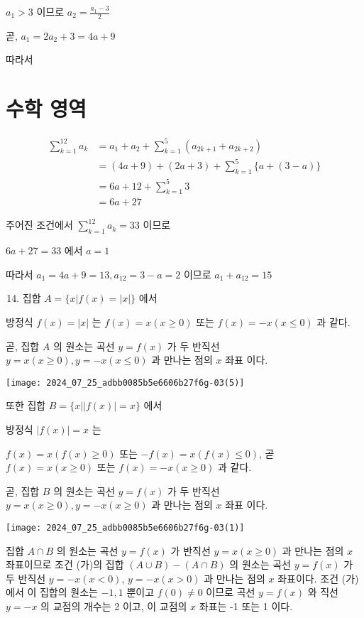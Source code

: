 \documentclass[10pt]{article}
\begin{document}
$a_{1}>3$ 이므로 $a_{2}=\frac{a_{1}-3}{2}$

곧, $a_{1}=2 a_{2}+3=4 a+9$

따라서

\section*{수학 영역}
\[
\begin{aligned}
\sum_{k=1}^{12} a_{k} & =a_{1}+a_{2}+\sum_{k=1}^{5}\left(a_{2 k+1}+a_{2 k+2}\right) \\
& =(4 a+9)+(2 a+3)+\sum_{k=1}^{5}\{a+(3-a)\} \\
& =6 a+12+\sum_{k=1}^{5} 3 \\
& =6 a+27
\end{aligned}
\]

주어진 조건에서 $\sum_{k=1}^{12} a_{k}=33$ 이므로

$6 a+27=33$ 에서 $a=1$

따라서 $a_{1}=4 a+9=13, a_{12}=3-a=2$ 이므로 $a_{1}+a_{12}=15$

\begin{enumerate}
  \setcounter{enumi}{13}
  \item 집합 $A=\{x|f(x)=| x \mid\}$ 에서
\end{enumerate}

방정식 $f(x)=|x|$ 는 $f(x)=x(x \geq 0)$ 또는 $f(x)=-x(x \leq 0)$ 과 같다.

곧, 집합 $A$ 의 원소는 곡선 $y=f(x)$ 가 두 반직선 $y=x(x \geq 0), y=-x(x \leq 0)$ 과 만나는 점의 $x$ 좌표 이다.

\begin{center}
\texttt{[image: 2024\_07\_25\_adbb0085b5e6606b27f6g-03(5)]}
\end{center}

또한 집합 $B=\{x|| f(x) \mid=x\}$ 에서

방정식 $|f(x)|=x$ 는

$f(x)=x(f(x) \geq 0)$ 또는 $-f(x)=x(f(x) \leq 0)$, 곧 $f(x)=x(x \geq 0)$ 또는 $f(x)=-x(x \geq 0)$ 과 같다.

곧, 집합 $B$ 의 원소는 곡선 $y=f(x)$ 가 두 반직선 $y=x(x \geq 0), y=-x(x \geq 0)$ 과 만나는 점의 $x$ 좌표 이다.

\begin{center}
\texttt{[image: 2024\_07\_25\_adbb0085b5e6606b27f6g-03(1)]}
\end{center}

집합 $A \cap B$ 의 원소는 곡선 $y=f(x)$ 가 반직선 $y=x(x \geq 0)$ 과 만나는 점의 $x$ 좌표이므로 조건 (가)의 집합 $(A \cup B)-(A \cap B)$ 의 원소는 곡선 $y=f(x)$ 가 두 반직선 $y=-x(x<0)$, $y=-x(x>0)$ 과 만나는 점의 $x$ 좌표이다. 조건 (가)에서 이 집합의 원소는 $-1,1$ 뿐이고 $f(0) \neq 0$ 이므로 곡선 $y=f(x)$ 와 직선 $y=-x$ 의 교점의 개수는 2 이고, 이 교점의 $x$ 좌표는 -1 또는 1 이다.
\end{document}
